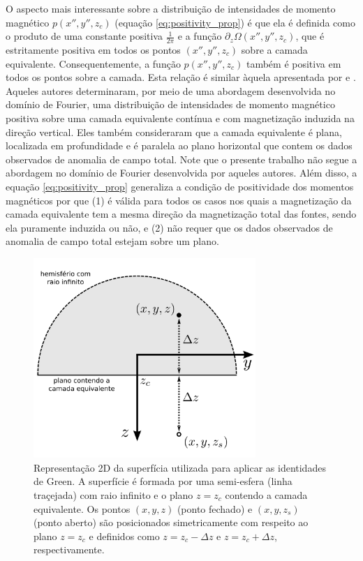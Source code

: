 O aspecto mais interessante sobre a distribuição de intensidades de momento magnético 
$p(x'', y'', z_{c})$ (equação \ref{eq:positivity_prop}) é que ela é definida como o produto de 
uma constante positiva $\frac{1}{2\pi}$ e a função $\partial_{z} \Omega(x'',y'',z_{c})$, que é 
estritamente positiva em todos os pontos $(x'',y'',z_{c})$ sobre a camada equivalente. 
Consequentemente, a função $p(x'', y'', z_{c})$ também é positiva em todos os pontos sobre a camada. 
Esta relação é similar àquela apresentada por \cite{pedersen1991} e \cite{li_etal_2014}. 
Aqueles autores determinaram, por meio de uma abordagem desenvolvida no domínio de Fourier, 
uma distribuição de intensidades de momento magnético positiva sobre uma camada equivalente 
contínua e com magnetização induzida na direção vertical. Eles também 
consideraram que a camada equivalente é plana, localizada em profundidade e é paralela 
ao plano horizontal que contem os dados observados de anomalia de campo total. 
Note que o presente trabalho não segue a abordagem no domínio de Fourier desenvolvida por aqueles 
autores. Além disso, a equação \ref{eq:positivity_prop} generaliza a condição de positividade dos 
momentos magnéticos por que (1) é válida para todos os casos nos quais a magnetização da camada 
equivalente tem a mesma direção da magnetização total das fontes, sendo ela puramente induzida ou não, 
e (2) não requer que os dados observados de anomalia de campo total estejam sobre um plano.

\begin{figure}[H]
	\centering
	\includegraphics[width=0.75\textwidth]{Fig/eqlayer/surface_Green.png}
	\caption{ Representação 2D da superfícia utilizada para aplicar as identidades de Green. A superfície é formada por uma semi-esfera (linha traçejada) com raio infinito e o plano $z = z_{c}$ contendo a camada equivalente. Os pontos $(x, y, z)$ (ponto fechado) e $(x, y, z_{s})$ (ponto aberto) são posicionados simetricamente com respeito ao plano $z = z_{c}$ e definidos como $z = z_{c} - \Delta z$ e $z = z_{c} + \Delta z$, respectivamente.}
	\label{fig:surface_Green}
\end{figure}